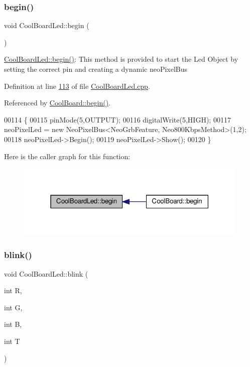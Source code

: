 \subsubsection{\texorpdfstring{begin()}{begin()}}
{\footnotesize\ttfamily void Cool\+Board\+Led\+::begin (\begin{DoxyParamCaption}{ }\end{DoxyParamCaption})}

\hyperlink{class_cool_board_led_ae3cbde8affcc6f011cbd698c8ef911f6}{Cool\+Board\+Led\+::begin()}\+: This method is provided to start the Led Object by setting the correct pin and creating a dynamic neo\+Pixel\+Bus 

Definition at line \hyperlink{_cool_board_led_8cpp_source_l00113}{113} of file \hyperlink{_cool_board_led_8cpp_source}{Cool\+Board\+Led.\+cpp}.



Referenced by \hyperlink{_cool_board_8cpp_source_l00021}{Cool\+Board\+::begin()}.


\begin{DoxyCode}
00114 \{
00115     pinMode(5,OUTPUT);
00116     digitalWrite(5,HIGH);
00117     neoPixelLed = \textcolor{keyword}{new} NeoPixelBus<NeoGrbFeature, Neo800KbpsMethod>(1,2); 
00118     neoPixelLed->Begin();
00119     neoPixelLed->Show();
00120 \} 
\end{DoxyCode}
Here is the caller graph for this function\+:\nopagebreak
\begin{figure}[H]
\begin{center}
\leavevmode
\includegraphics[width=315pt]{class_cool_board_led_ae3cbde8affcc6f011cbd698c8ef911f6_icgraph}
\end{center}
\end{figure}
\mbox{\label{class_cool_board_led_a27706bc029f6a126c55d0b91624ad7fa}} 
\subsubsection{\texorpdfstring{blink()}{blink()}}
{\footnotesize\ttfamily void Cool\+Board\+Led\+::blink (\begin{DoxyParamCaption}\item[{int}]{R,  }\item[{int}]{G,  }\item[{int}]{B,  }\item[{int}]{T }\end{DoxyParamCaption})}

